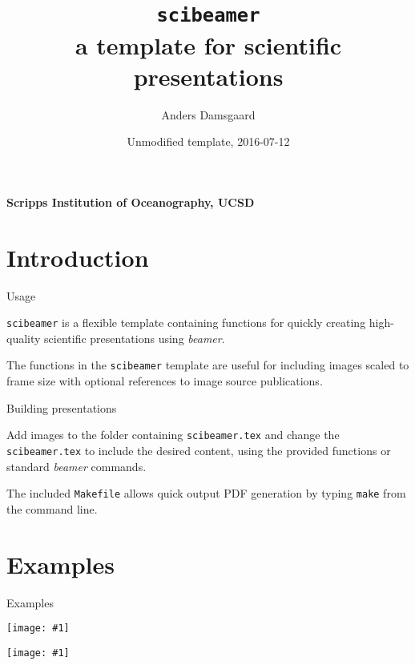 \documentclass[11pt]{beamer}
\title{\texttt{scibeamer}\\ a template for scientific presentations}
\author[A. Damsgaard]{Anders Damsgaard}
\institute[SIO]{Scripps Institution of Oceanography\\[2mm]
{\small \url{adamsgaard@ucsd.edu}}}
\date{\small Unmodified template, 2016-07-12}
\newcommand{\titleframe}[1]{\begin{frame}\begin{center}\huge{#1}\end{center}\end{frame}}
\newcommand{\plainimageframe}[2]{\begin{frame}\begin{center}\centering\texttt{[image: \#1]}\end{center}\end{frame}}
\newcommand{\plainimageframeheight}[2]{\begin{frame}\begin{center}\centering\texttt{[image: \#1]}\end{center}\end{frame}}
\begin{document}
\begin{frame}[fragile]
  \begin{centering}
    \framesubtitle{Scripps Institution of Oceanography, UCSD}
    \titlepage{}
  \end{centering}
\end{frame}


\section{Introduction}

\begin{frame}{Usage}

    \texttt{scibeamer} is a flexible template containing functions for quickly 
    creating high-quality scientific presentations using \emph{beamer}.

    \vspace{1em}

    The functions in the \texttt{scibeamer} template are useful for including 
    images scaled to frame size with optional references to image source 
    publications.

\end{frame}

\begin{frame}{Building presentations}

    Add images to the folder containing \texttt{scibeamer.tex} and change the 
    \texttt{scibeamer.tex} to include the desired content, using the provided 
    functions or standard \emph{beamer} commands.

    \vspace{1em}

    The included \texttt{Makefile} allows quick output PDF generation by typing 
    \texttt{make} from the command line.

\end{frame}


\section{Examples}

\titleframe{Examples}

\plainimageframe{graphics/fig1.pdf}{1.0}

\plainimageframeheight{graphics/fig1.pdf}{0.5}
\end{document}
